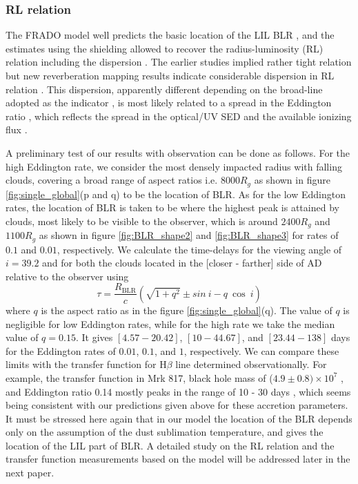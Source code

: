 \documentclass[twocolumn]{aastex62}
\begin{document}
\subsubsection{RL relation}

The FRADO model well predicts the basic location of the LIL BLR \citep{Czerny2011,Czerny2017}, and the estimates using the shielding allowed to recover the radius-luminosity (RL) relation including the dispersion \citep{Naddaf2020}. The earlier studies implied rather tight relation but new reverberation mapping results indicate considerable dispersion in RL relation \citep{CzernyTimedelay2019, Dupu2019, fonseca2020, Martinez2020}. This dispersion, apparently different depending on the broad-line adopted as the indicator \citep{zhang2021}, is most likely related to a spread in the Eddington ratio \citep[e.g.][]{Dupu2016, Naddaf2020, michal2020, michal2021}, which reflects the spread in the optical/UV SED and the available ionizing flux \citep{fonseca2020}. 

A preliminary test of our results with observation can be done as follows. For the high Eddington rate, we consider the most densely impacted radius with falling clouds, covering a broad range of aspect ratios i.e. $8000 R_{g}$ as shown in figure \ref{fig:single_global}(p and q) to be the location of BLR. As for the low Eddington rates, the location of BLR is taken to be where the highest peak is attained by clouds, most likely to be visible to the observer, which is around $2400 R_{g}$ and $1100 R_{g}$ as shown in figure \ref{fig:BLR_shape2} and \ref{fig:BLR_shape3} for rates of $0.1$ and $0.01$, respectively. We calculate the time-delays for the viewing angle of $i=39.2$ \citep{Lawrence2010} and for both the clouds located in the [closer - farther] side of AD relative to the observer using
\begin{equation}
\tau = \frac{R_{\mathrm{BLR}}}{c} \left( \sqrt{1+ q^2} \pm sin~i - q~ \cos~i \right)
\end{equation}
where $q$ is the aspect ratio as in the figure \ref{fig:single_global}(q). The value of $q$ is negligible for low Eddington rates, while for the high rate we take the median value of $q=0.15$. It gives $[4.57 - 20.42]$, $[10 - 44.67]$, and $[23.44 - 138]$ days for the Eddington rates of $0.01$, $0.1$, and $1$, respectively.
We can compare these limits with the transfer function for H$\beta$ line determined observationally. For example, the transfer function in Mrk 817, black hole mass of ($4.9 \pm 0.8) \times 10^7$ \citep{peterson2004}, and Eddington ratio 0.14 \citep{li2016} mostly peaks in the range of 10 - 30 days \citep{li2016}, which seems being consistent with our predictions given above for these accretion parameters. It must be stressed here again that in our model the location of the BLR depends only on the assumption of the dust sublimation temperature, and gives the location of the LIL part of BLR.
A detailed study on the RL relation and the transfer function measurements based on the model will be addressed later in the next paper.
\end{document}
